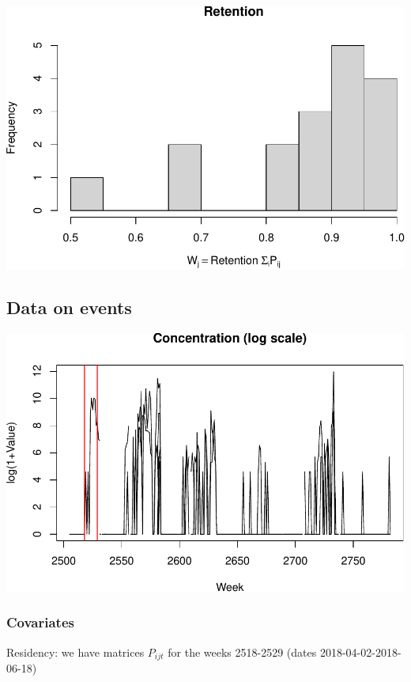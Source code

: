 \documentclass[
]{article}
\begin{document}
\includegraphics{habmodel_files/figure-latex/unnamed-chunk-4-1.pdf}

\hypertarget{data-on-events}{%
\subsection{Data on events}\label{data-on-events}}

\includegraphics{habmodel_files/figure-latex/unnamed-chunk-5-1.pdf}

\hypertarget{covariates}{%
\subsubsection{Covariates}\label{covariates}}

Residency: we have matrices \(P_{ijt}\) for the weeks 2518-2529 (dates
2018-04-02-2018-06-18)
\end{document}
